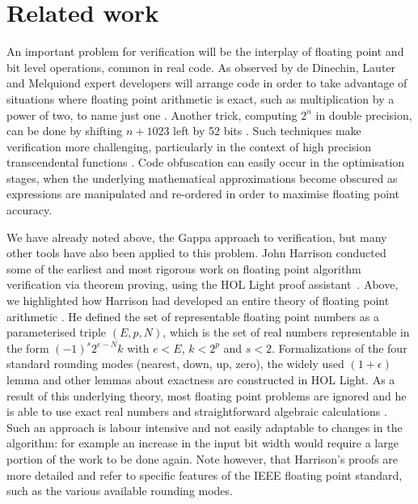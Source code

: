 \documentclass{fac}
\begin{document}
\section{Related work}
\label{Related}
An important problem for verification will be the interplay of floating point and bit level operations, common in real code. As observed by de Dinechin, Lauter and Melquiond expert developers will arrange code in order to take advantage of situations where floating point arithmetic is exact, such as multiplication by a power of two, to name just one \cite{de2006assisted}. Another trick, computing $2^n$ in double precision, can be done by shifting $n+1023$ left by 52 bits \cite{mine2012abstract}. Such techniques make verification more challenging, particularly in the context of high precision transcendental functions \cite{lee2016verifying}. Code obfuscation can easily occur in the optimisation stages, when the underlying mathematical approximations become obscured as expressions are manipulated and re-ordered in order to maximise floating point accuracy.

We have already noted above, the Gappa approach to verification, but many other tools have also been applied to this problem. John Harrison conducted some of the earliest and most rigorous work on floating point algorithm verification via theorem proving, using the HOL Light proof assistant~\cite{harrison1997floating}. Above, we highlighted how Harrison had developed an entire theory of floating point arithmetic \cite{harrison1999machine}. He defined the set of representable floating point numbers as a parameterised triple $(E,p,N)$, which is the set of real numbers representable in the form $(-1)^s 2^{e-N} k$ with $e<E$, $k<2^p$ and $s<2$. Formalizations of the four standard rounding modes (nearest, down, up, zero), the widely used $(1+\epsilon)$ lemma and other lemmas about exactness are constructed in HOL Light. As a result of this underlying theory, most floating point problems are ignored and he is able to use exact real numbers and straightforward algebraic calculations \cite{harrison1999machine}. Such an approach is labour intensive and not easily adaptable to changes in the algorithm: for example an increase in the input bit width would require a large portion of the work to be done again. Note however, that Harrison's proofs are more detailed and refer to specific features of the IEEE floating point standard, such as the various available rounding modes. 
\end{document}
